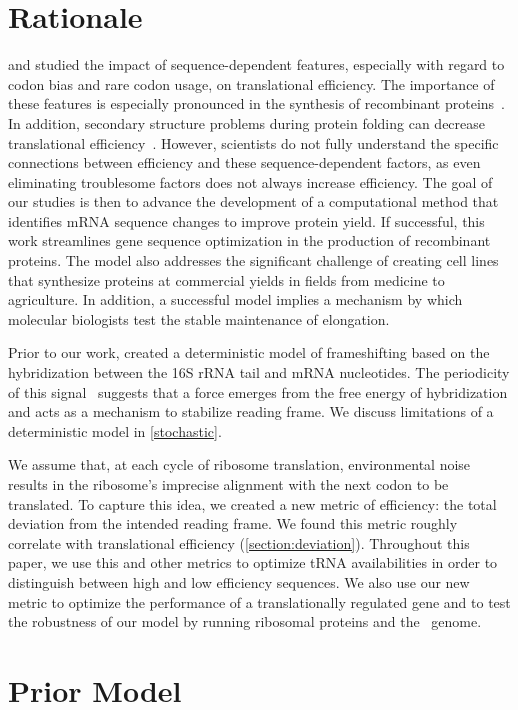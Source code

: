 \documentclass[twocolumn]{article}
\begin{document}
\section{Rationale}
\citet{kozak05} and \citet{kane95} studied the impact
of sequence-dependent features, especially with regard to codon bias 
and rare codon usage, on translational efficiency.  The importance of 
these features is especially pronounced in the synthesis of recombinant 
proteins~\cite{sorensen05}.  In addition, secondary structure problems 
during protein folding can decrease translational 
efficiency~\cite{kozak05}.  However, scientists do not fully
understand the specific connections between efficiency and these
sequence-dependent factors, as even eliminating troublesome factors
does not always increase efficiency. The goal of our studies is then to
advance the development of a computational method that identifies mRNA
sequence changes to improve protein yield. If
successful, this work streamlines gene sequence optimization in the
production of recombinant proteins. The model also addresses the
significant challenge of creating cell lines
that synthesize proteins at commercial yields in fields from
medicine to agriculture. In addition, a successful model implies a mechanism by
which molecular biologists test the stable maintenance of
elongation.

Prior to our work, \citet{lalit:jbsb} created a deterministic model of
frameshifting based on the hybridization between the 16S rRNA tail and
mRNA nucleotides.  The periodicity of this
signal~\cite{lalit:jbsb} suggests that a force emerges from the free
energy of hybridization and acts as a mechanism to
stabilize reading frame.  We discuss limitations of a deterministic 
model in \autoref{stochastic}.

We assume that, at each cycle of ribosome translation, environmental
noise results in the ribosome's imprecise alignment
with the next codon to be translated.  To capture this idea, we
created a new metric of efficiency: the total deviation from the
intended reading frame.  We found this metric
roughly correlate with translational
efficiency (\autoref{section:deviation}).  Throughout this paper, we use this and other metrics to
optimize tRNA availabilities in order to distinguish between
high and low efficiency sequences. We also use our new
metric to optimize the performance of a translationally regulated gene
and to test the robustness of our model by running  ribosomal proteins and the
\ecoli\ genome.

\section{Prior Model}
\end{document}
